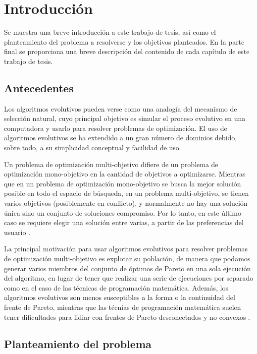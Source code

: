 \chapter*{Introducci\'on}
  Se muestra una breve introducci\'on a este trabajo de tesis, as\'i como el planteamiento del problema 
  a resolverse y los objetivos planteados. En la parte final se proporciona una breve descripci\'on 
  del contenido de cada cap\'itulo de este trabajo de tesis.

\section*{Antecedentes}

  Los algoritmos evolutivos pueden verse como una analog\'ia del mecanismo de selecci\'on natural, cuyo principal objetivo es 
  simular el proceso evolutivo en una computadora y usarlo para resolver problemas de optimizaci\'on. El uso de 
  algoritmos evolutivos se ha extendido a un gran n\'umero de dominios debido, sobre todo, a su simplicidad conceptual
  y facilidad de uso.
  
  Un problema de optimizaci\'on multi-objetivo difiere de un problema de  optimizaci\'on mono-objetivo en la cantidad de 
  objetivos a optimizarse. Mientras que en un problema de optimizaci\'on mono-objetivo se busca la mejor soluci\'on posible 
  en todo el espacio de b\'usqueda, en un problema multi-objetivo, se tienen varios objetivos (posiblemente 
  en conflicto), y normalmente no hay una soluci\'on \'unica sino un conjunto de soluciones compromiso. Por lo tanto, en este 
  \'ultimo caso se requiere elegir una soluci\'on entre varias, a partir de las preferencias del usuario \cite{Miettinen98}.
  
  La principal motivaci\'on para usar algoritmos evolutivos para resolver problemas de optimizaci\'on multi-objetivo  
  es explotar su poblaci\'on, de manera que podamos generar varios miembros del conjunto de \'optimos de Pareto en una sola 
  ejecuci\'on del algoritmo, en lugar de tener que realizar una serie de ejecuciones por separado como en el caso de las 
  t\'ecnicas de programaci\'on matem\'atica. Adem\'as, los algoritmos evolutivos son menos susceptibles a la forma o la 
  continuidad del frente de Pareto, mientras que las t\'ecnias de programaci\'on matem\'atica suelen tener dificultades 
  para lidiar con frentes de Pareto desconectados y no convexos \cite{EASMC85}.

\section*{Planteamiento del problema}


